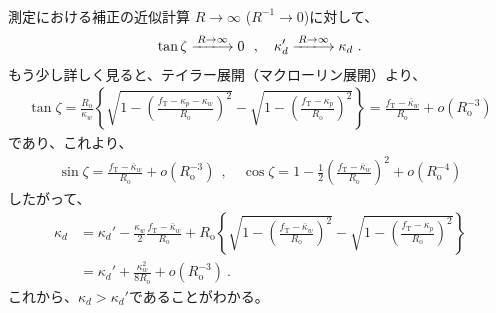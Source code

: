 \clearpage
~\vfill
\begin{Column}{測定における\KeywayDepth 補正の近似計算}
$R\to\infty$ ($R^{-1}\to0$)に対して、
\begin{align*}
  \tan\zeta \xlongrightarrow{R\to\infty} 0~~, \quad
  \kappa_d' \xlongrightarrow{R\to\infty} \kappa_d\ .
\end{align*}
もう少し詳しく見ると、テイラー展開（マクローリン展開）より、
\begin{align*}
  \tan\zeta
  = \frac{R_\mathrm o}{\kappa_w}
     \left\{
     \sqrt{1-\left(\frac{f_\mathrm T-\kappa_p-\kappa_w}{R_\mathrm o}\right)^2}
     -\sqrt{1-\left(\frac{f_\mathrm T-\kappa_p}{R_\mathrm o}\right)^2}
     \right\}
  = \frac{f_\mathrm T-\bar\kappa_w}{R_\mathrm o}+o\left(R_\mathrm o^{-3}\right)
\end{align*}
であり、これより、
\begin{align*}
  \sin\zeta = \frac{f_\mathrm T-\bar\kappa_w}{R_\mathrm o}+o\left(R_\mathrm o^{-3}\right)~~, \quad
  \cos\zeta = 1-\frac12\left(\frac{f_\mathrm T-\bar\kappa_w}{R_\mathrm o}\right)^2
              +o\left(R_\mathrm o^{-4}\right)
\end{align*}
したがって、
\begin{align*}
  \kappa_d
  &= \kappa_d'-\frac{\kappa_w}2\frac{f_\mathrm T-\bar\kappa_w}{R_\mathrm o}
     +R_\mathrm o
      \left\{
      \sqrt{1-\left(\frac{f_\mathrm T-\bar\kappa_w}{R_\mathrm o}\right)^2}
      -\sqrt{1-\left(\frac{f_\mathrm T-\kappa_p}{R_\mathrm o}\right)^2}
      \right\}\\
  &= \kappa_d'+\frac{\kappa_w^2}{8R_\mathrm o}
     +o\left(R_\mathrm o^{-3}\right)\ .
\end{align*}
これから、$\kappa_d > \kappa_d'$であることがわかる。
\end{Column}
